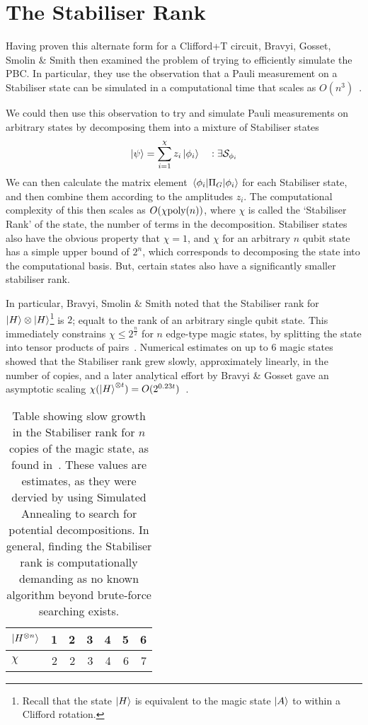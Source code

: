 \documentclass{standalone}
\begin{document}
\section{The Stabiliser Rank}\label{sec:srank}
Having proven this alternate form for a Clifford+T circuit, Bravyi, Gosset, Smolin \& Smith then examined the problem of trying to efficiently simulate the PBC. In particular, they use the observation that a Pauli measurement on a Stabiliser state can be simulated in a computational time that scales as $O(n^{3})$~\cite{Aaronson2004a,Bravyi2015}. 
\par
We could then use this observation to try and simulate Pauli measurements on arbitrary states by decomposing them into a mixture of Stabiliser states 
\begin{equation}
\ket{\psi} = \sum_{i=1}^{\chi}z_{i}\ket{\phi_{i}}\quad:\exists\mathcal{S}_{\phi_i}
\end{equation}
We can then calculate the matrix element $\matrixel{\phi_{i}}{\Pi_{G}}{\phi_{i}}$ for each Stabiliser state, and then combine them according to the amplitudes $z_{i}$. The computational complexity of this then scales as $O(\chi \text{poly}(n))$, where $\chi$ is called the `Stabiliser Rank' of the state, the number of terms in the decomposition. Stabiliser states also have the obvious property that $\chi=1$, and $\chi$ for an arbitrary $n$ qubit state has a simple upper bound of $2^{n}$, which corresponds to decomposing the state into the computational basis. But, certain states also have a significantly smaller stabiliser rank.
\par
In particular, Bravyi, Smolin \& Smith noted that the Stabiliser rank for $\ket{H}\otimes\ket{H}$\footnote{Recall that the state $\ket{H}$ is equivalent to the magic state $\ket{A}$ to within a Clifford rotation.} is $2$; equalt to the rank of an arbitrary single qubit state. This immediately constrains $\chi\leq 2^{\frac{n}{2}}$ for $n$ edge-type magic states, by splitting the state into tensor products of pairs~\cite{Bravyi2015}. Numerical estimates on up to 6 magic states showed that the Stabiliser rank grew slowly, approximately linearly, in the number of copies, and a later analytical effort by Bravyi \& Gosset gave an asymptotic scaling $\chi(\ket{H}^{\otimes t})=O(2^{0.23 t})$~\cite{Bravyi2016b}.
\par
\begin{table}[b]
\centering
\begin{tabular}{||l|r|r|r|r|r|r||}
\hline
$\ket{H^{\otimes n}}$ & 1 & 2 & 3 & 4 & 5 & 6 \\ \hline
$\chi$ & 2 & 2 & 3 & 4 & 6 & 7\\ \hline
\end{tabular}
\caption{Table showing slow growth in the Stabiliser rank for $n$ copies of the magic state, as found in~\cite{Bravyi2015}. These values are estimates, as they were dervied by using Simulated Annealing to search for potential decompositions. In general, finding the Stabiliser rank is computationally demanding as no known algorithm beyond brute-force searching exists.}
\label{tab:approxchi}
\end{table}
\end{document}
